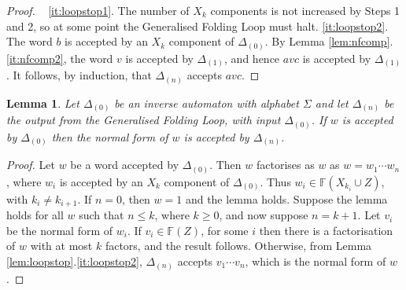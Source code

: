 \documentclass[a4paper,12pt]{article}
\renewcommand{\a}{\alpha }
\renewcommand{\b}{\beta }
\newcommand{\g}{\gamma }
\newcommand{\D}{\Delta }
\renewcommand{\d}{\delta }
\renewcommand{\L}{\Lambda }
\renewcommand{\S}{\Sigma }
\newtheorem{lemma}[theorem]{Lemma}
\numberwithin{equation}{section}
\numberwithin{figure}{section}
\newcommand{\FF}{\ensuremath{\mathbb{F}}}
\begin{document}
\begin{proof}
~
\ref{it:loopstop1}. The number of $X_k$ components is not
increased by Steps 1 and 2, so at some point the Generalised Folding 
Loop must halt.
\noindent \ref{it:loopstop2}. The word $b$ is accepted by an $X_k$
component of $\D_{(0)}$. By Lemma \ref{lem:nfcomp}.\ref{it:nfcomp2}, 
 the word $v$ is accepted by
$\D_{(1)}$, and hence $avc$ is accepted by $\D_{(1)}$. It follows,
by induction, that $\D_{(n)}$ accepts $avc$.
\end{proof}
\begin{lemma}\label{lem:nfacc}
Let $\D_{(0)}$ be an inverse automaton with alphabet $\S$ and let
$\D_{(n)}$ be the output from the Generalised Folding Loop, with input $\D_{(0)}$. If $w$ is
accepted by $\D_{(0)}$ then the normal form of $w$ is accepted by $\D_{(n)}$.
\end{lemma}
\begin{proof}
Let $w$ be a word accepted by $\D_{(0)}$. Then $w$ factorises as  $w$
as $w=w_1\cdots w_n$, where $w_i$ is accepted by an $X_k$
component of $\D_{(0)}$. Thus $w_i\in \FF(X_{k_i}\cup Z)$, with $k_i\neq
k_{i+1}$. If $n=0$, then $w=1$ and the lemma holds. Suppose the
lemma holds for all $w$ such that $n\le k$, where $k\ge 0$, and now
suppose $n=k+1$. Let $v_i$ be the normal form of $w_i$. If $v_i\in
\FF(Z)$, for some $i$ then there is a factorisation of $w$ with at
most $k$ factors, and the result follows. Otherwise, from Lemma
\ref{lem:loopstop}.\ref{it:loopstop2},  $\D_{(n)}$ accepts $v_1\cdots
v_n$, which is the normal form of $w$.

\end{proof}
\end{document}
